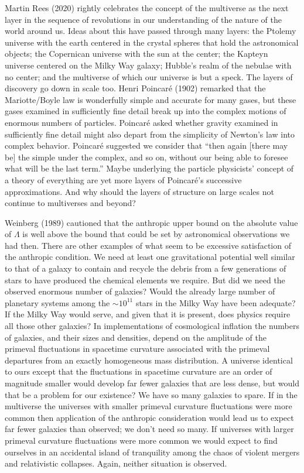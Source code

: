 \documentclass[fleqn,usenatbib]{mnras}
\begin{document}
Martin Rees (2020) rightly celebrates the concept of the multiverse as the next layer in the sequence of revolutions in our understanding of the nature of the world around us. Ideas about this have passed through many layers: the Ptolemy universe with the earth centered in the crystal spheres that hold the astronomical objects; the Copernican universe with the sun at the center; the Kapteyn universe centered on the Milky Way galaxy; Hubble's realm of the nebulae with no center; and the multiverse of which our universe is but a speck. The layers of discovery go down in scale too. Henri Poincar\'e (1902) remarked that the Mariotte/Boyle law is wonderfully simple and accurate for many gases, but these gases examined in sufficiently fine detail break up into the complex motions of enormous numbers of particles. Poincar\'e asked whether gravity examined in sufficiently fine detail might also depart from the simplicity of Newton's law into complex behavior. Poincar\'e suggested we consider that ``then again [there may be] the simple under the complex, and so on, without our being able to foresee what will be the last term.'' Maybe underlying the particle physicists' concept of a theory of everything are yet more layers of Poincar\'e's successive approximations. And why should the layers of structure on large scales not continue to multiverses and beyond? 

 Weinberg (1989) cautioned that the anthropic upper bound on the absolute value of $\Lambda$ is well above the bound that could be set by astronomical observations we had then. There are other examples of what seem to be excessive satisfaction of the anthropic condition. We need at least one gravitational potential well similar to that of a galaxy to contain and recycle the debris from a few generations of stars to have produced the chemical elements we require. But did we need the observed enormous number of galaxies? Would the already large number of planetary systems among the $\sim 10^{11}$ stars in the Milky Way have been adequate? If the Milky Way would serve, and given that it is present, does physics require all those other galaxies? In implementations of cosmological inflation the numbers of galaxies, and their sizes and densities, depend on the amplitude of the primeval fluctuations in spacetime curvature associated with the primeval departures from an exactly homogeneous mass distribution. A universe identical to ours except that the fluctuations in spacetime curvature are an order of magnitude smaller would develop far fewer galaxies that are less dense, but would that be a problem for our existence? We have so many galaxies to spare. If in the multiverse the universes with smaller primeval curvature fluctuations were more common then application of the anthropic consideration would lead us to expect far fewer galaxies than observed; we don't need so many. If universes with larger primeval curvature fluctuations were more common we would expect to find ourselves in an accidental island of tranquility among the chaos of violent mergers and relativistic collapses. Again, neither situation is observed.
\end{document}
